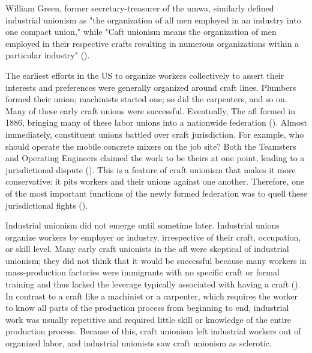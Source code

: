 \documentclass[12pt]{article}
\begin{document}
\noindent{}William Green, former secretary-treasurer of the \acrfull{umwa}, similarly defined industrial unionism as "the organization of all men employed in an industry into one compact union," while "Caft unionism means the organization of men employed in their respective crafts resulting in numerous organizations within a particular industry" (\cite[69–70]{sapossIndustrialUnionism1935}).

The earliest efforts in the US to organize workers collectively to assert their interests and preferences were generally organized around craft lines. Plumbers formed their union; machinists started one; so did the carpenters, and so on. Many of these early craft unions were successful. Eventually, The \acrfull{afl} formed in 1886, bringing many of these labor unions into a nationwide federation (\cite[97]{suffernCraftVsIndustrial1936}). Almost immediately, constituent unions battled over craft jurisdiction. For example, who should operate the mobile concrete mixers on the job site? Both the Teamsters and Operating Engineers claimed the work to be theirs at one point, leading to a jurisdictional dispute (\cite{jaffe1940}). This is a feature of craft unionism that makes it more conservative: it pits workers and their unions against one another. Therefore, one of the most important functions of the newly formed federation was to quell these jurisdictional fights (\cite{jaffe1940}).


Industrial unionism did not emerge until sometime later. Industrial unions organize workers by employer or industry, irrespective of their craft, occupation, or skill level. Many early craft unionists in the \acrshort{afl} were skeptical of industrial unionism; they did not think that it would be successful because many workers in mass-production factories were immigrants with no specific craft or formal training and thus lacked the leverage typically associated with having a craft (\cite{fonerHistoryLaborMovement1994, fonerHistoryLaborMovement1981a}). In contrast to a craft like a machinist or a carpenter, which requires the worker to know all parts of the production process from beginning to end, industrial work was usually repetitive and required little skill or knowledge of the entire production process. Because of this, craft unionism left industrial workers out of organized labor, and industrial unionists saw craft unionism as sclerotic.
\end{document}
